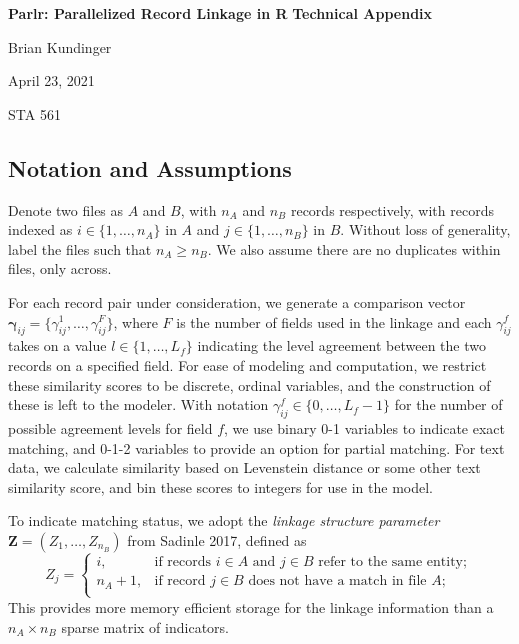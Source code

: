\documentclass[
  12pt,
]{article}
\author{}
\date{\vspace{-2.5em}}
\begin{document}
\begin{flushright} 
    \end{flushright}
    \begin{center} \textbf{Parlr: Parallelized Record Linkage in R} \linebreak
    \textbf{Technical Appendix}
    
    Brian Kundinger
    
    April 23, 2021
    
    STA 561

    \end{center}

\hypertarget{notation-and-assumptions}{%
\subsection{Notation and Assumptions}\label{notation-and-assumptions}}

Denote two files as \(A\) and \(B\), with \(n_A\) and \(n_B\) records
respectively, with records indexed as \(i \in \{1, \ldots, n_A\}\) in
\(A\) and \(j \in \{1, \ldots, n_B\}\) in \(B\). Without loss of
generality, label the files such that \(n_A \geq n_B\). We also assume
there are no duplicates within files, only across.

For each record pair under consideration, we generate a comparison
vector
\(\boldsymbol{\gamma}_{ij} = \{\gamma_{ij}^1, \ldots, \gamma_{ij}^F\}\),
where \(F\) is the number of fields used in the linkage and each
\(\gamma_{ij}^f\) takes on a value \(l \in \{1, \ldots, L_f\}\)
indicating the level agreement between the two records on a specified
field. For ease of modeling and computation, we restrict these
similarity scores to be discrete, ordinal variables, and the
construction of these is left to the modeler. With notation
\(\gamma_{ij}^f \in \{0, \ldots, L_f - 1\}\) for the number of possible
agreement levels for field \(f\), we use binary 0-1 variables to
indicate exact matching, and 0-1-2 variables to provide an option for
partial matching. For text data, we calculate similarity based on
Levenstein distance or some other text similarity score, and bin these
scores to integers for use in the model.

To indicate matching status, we adopt the \emph{linkage structure
parameter} \(\mathbf{Z} = (Z_1, \ldots, Z_{n_B})\) from Sadinle 2017,
defined as \[Z_j=\begin{cases} 
    i,  & \text{if records } i\in A \text{ and } j\in B \text{ refer to the same entity}; \\
    n_A + 1,  & \text{if record } j\in B \text{ does not have a match in file } A; \\
\end{cases}\] This provides more memory efficient storage for the
linkage information than a \(n_A \times n_B\) sparse matrix of
indicators.
\end{document}
